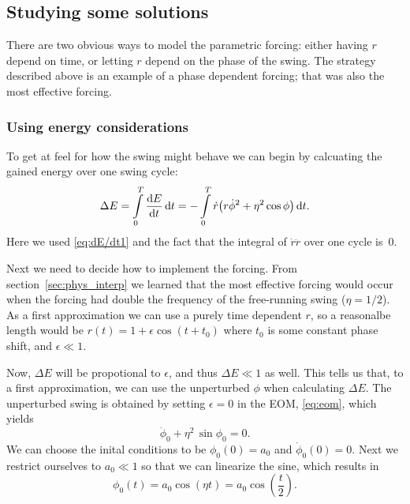 \documentclass[11pt,letter, swedish, english
]{article}
\begin{document}
\subsection{Studying some solutions}
\newcommand{\DE}{\Delta{E}}
There are two obvious ways to model the parametric forcing: either
having $r$ depend on time, or letting $r$ depend on the phase of the
swing. The strategy described above is an example of a phase dependent
forcing; that was also the most effective forcing. 



\subsubsection{Using energy considerations}
To get at feel for how the swing might behave we can begin by
calcuating the gained energy over one swing cycle:
\begin{equation}\label{eq:DE1}
\DE=\int_0^T\dv{E}{t}\id{t}
=-\int_0^T \dot{r}\qty(r\dot{\phi}^2 + \eta^2\cos\phi)\id{t}.
\end{equation}
Here we used \eqref{eq:dE/dt1} and the fact that the integral of
$\dot{r}\ddot{r}$ over one cycle is~$0$. 

Next we need to decide how to implement the forcing. From
section~\ref{sec:phys_interp} we learned that the most effective
forcing would occur when the forcing had double the frequency of the
free-running swing ($\eta=1/2$). As a first approximation we can use a purely time
dependent $r$, so a reasonalbe length would be
$ %
r(t)=1+\epsilon\cos(t+t_0)
$ %
where $t_0$ is some constant phase shift, and $\epsilon\ll1$. 

Now, $\DE$ will be propotional to $\epsilon$, and thus $\DE\ll1$ as
well. This tells us that, to a first approximation, we can use the
unperturbed $\phi$ when calculating $\DE$. The unperturbed swing is
obtained by setting $\epsilon=0$ in the EOM, \eqref{eq:eom}, which
yields
\begin{equation}
\ddot\phi_0+\eta^2\,\sin\phi_0=0.
\end{equation}
We can choose the inital conditions to be $\phi_0(0)=a_0$ and
$\dot\phi_0(0)=0$. Next we restrict ourselves to $a_0\ll1$ so that we
can linearize the sine, which results in
\begin{equation}
\phi_0(t)=a_0\cos(\eta t)=a_0\cos(\frac{t}{2}).
\end{equation}
\end{document}

